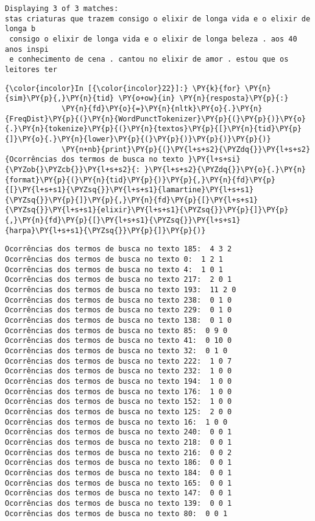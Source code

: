     \begin{Verbatim}[commandchars=\\\{\}]
Displaying 3 of 3 matches:
stas criaturas que trazem consigo o elixir de longa vida e o elixir de longa b
 consigo o elixir de longa vida e o elixir de longa beleza . aos 40 anos inspi
 e conhecimento de cena . cantou no elixir de amor . estou que os leitores ter

    \end{Verbatim}

    \begin{Verbatim}[commandchars=\\\{\}]
{\color{incolor}In [{\color{incolor}22}]:} \PY{k}{for} \PY{n}{sim}\PY{p}{,}\PY{n}{tid} \PY{o+ow}{in} \PY{n}{resposta}\PY{p}{:} 
             \PY{n}{fd}\PY{o}{=}\PY{n}{nltk}\PY{o}{.}\PY{n}{FreqDist}\PY{p}{(}\PY{n}{WordPunctTokenizer}\PY{p}{(}\PY{p}{)}\PY{o}{.}\PY{n}{tokenize}\PY{p}{(}\PY{n}{textos}\PY{p}{[}\PY{n}{tid}\PY{p}{]}\PY{o}{.}\PY{n}{lower}\PY{p}{(}\PY{p}{)}\PY{p}{)}\PY{p}{)}
             \PY{n+nb}{print}\PY{p}{(}\PY{l+s+s2}{\PYZdq{}}\PY{l+s+s2}{Ocorrências dos termos de busca no texto }\PY{l+s+si}{\PYZob{}\PYZcb{}}\PY{l+s+s2}{: }\PY{l+s+s2}{\PYZdq{}}\PY{o}{.}\PY{n}{format}\PY{p}{(}\PY{n}{tid}\PY{p}{)}\PY{p}{,}\PY{n}{fd}\PY{p}{[}\PY{l+s+s1}{\PYZsq{}}\PY{l+s+s1}{lamartine}\PY{l+s+s1}{\PYZsq{}}\PY{p}{]}\PY{p}{,}\PY{n}{fd}\PY{p}{[}\PY{l+s+s1}{\PYZsq{}}\PY{l+s+s1}{elixir}\PY{l+s+s1}{\PYZsq{}}\PY{p}{]}\PY{p}{,}\PY{n}{fd}\PY{p}{[}\PY{l+s+s1}{\PYZsq{}}\PY{l+s+s1}{harpa}\PY{l+s+s1}{\PYZsq{}}\PY{p}{]}\PY{p}{)}
\end{Verbatim}

    \begin{Verbatim}[commandchars=\\\{\}]
Ocorrências dos termos de busca no texto 185:  4 3 2
Ocorrências dos termos de busca no texto 0:  1 2 1
Ocorrências dos termos de busca no texto 4:  1 0 1
Ocorrências dos termos de busca no texto 217:  2 0 1
Ocorrências dos termos de busca no texto 193:  11 2 0
Ocorrências dos termos de busca no texto 238:  0 1 0
Ocorrências dos termos de busca no texto 229:  0 1 0
Ocorrências dos termos de busca no texto 138:  0 1 0
Ocorrências dos termos de busca no texto 85:  0 9 0
Ocorrências dos termos de busca no texto 41:  0 10 0
Ocorrências dos termos de busca no texto 32:  0 1 0
Ocorrências dos termos de busca no texto 222:  1 0 7
Ocorrências dos termos de busca no texto 232:  1 0 0
Ocorrências dos termos de busca no texto 194:  1 0 0
Ocorrências dos termos de busca no texto 176:  1 0 0
Ocorrências dos termos de busca no texto 152:  1 0 0
Ocorrências dos termos de busca no texto 125:  2 0 0
Ocorrências dos termos de busca no texto 16:  1 0 0
Ocorrências dos termos de busca no texto 240:  0 0 1
Ocorrências dos termos de busca no texto 218:  0 0 1
Ocorrências dos termos de busca no texto 216:  0 0 2
Ocorrências dos termos de busca no texto 186:  0 0 1
Ocorrências dos termos de busca no texto 184:  0 0 1
Ocorrências dos termos de busca no texto 165:  0 0 1
Ocorrências dos termos de busca no texto 147:  0 0 1
Ocorrências dos termos de busca no texto 139:  0 0 1
Ocorrências dos termos de busca no texto 80:  0 0 1

    \end{Verbatim}

